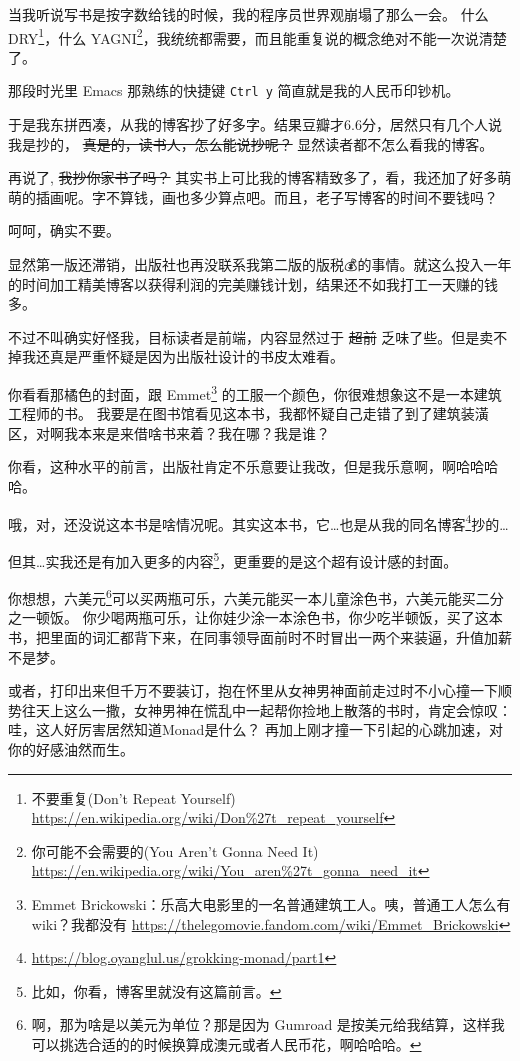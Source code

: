 \documentclass[letterspacing]{tufte-book}
\begin{document}
当我听说写书是按字数给钱的时候，我的程序员世界观崩塌了那么一会。
什么 DRY\footnote{不要重复(Don't Repeat Yourself) \url{https://en.wikipedia.org/wiki/Don\%27t\_repeat\_yourself}}，什么 YAGNI\footnote{你可能不会需要的(You Aren't Gonna Need It) \url{https://en.wikipedia.org/wiki/You\_aren\%27t\_gonna\_need\_it}}，我统统都需要，而且能重复说的概念绝对不能一次说清楚了。

那段时光里 Emacs 那熟练的快捷键 \texttt{Ctrl y} 简直就是我的人民币印钞机。

于是我东拼西凑，从我的博客抄了好多字。结果豆瓣才6.6分，居然只有几个人说我是抄的， \sout{真是的，读书人，怎么能说抄呢？} 显然读者都不怎么看我的博客。

再说了, \sout{我抄你家书了吗？} 其实书上可比我的博客精致多了，看，我还加了好多萌萌的插画呢。字不算钱，画也多少算点吧。而且，老子写博客的时间不要钱吗？

呵呵，确实不要。

显然第一版还滞销，出版社也再没联系我第二版的版税💰的事情。就这么投入一年的时间加工精美博客以获得利润的完美赚钱计划，结果还不如我打工一天赚的钱多。

不过不叫确实好怪我，目标读者是前端，内容显然过于 \sout{超前} 乏味了些。但是卖不掉我还真是严重怀疑是因为出版社设计的书皮太难看。

你看看那橘色的封面，跟 Emmet\footnote{Emmet Brickowski：乐高大电影里的一名普通建筑工人。咦，普通工人怎么有wiki？我都没有 \url{https://thelegomovie.fandom.com/wiki/Emmet\_Brickowski}} 的工服一个颜色，你很难想象这不是一本建筑工程师的书。
我要是在图书馆看见这本书，我都怀疑自己走错了到了建筑装潢区，对啊我本来是来借啥书来着？我在哪？我是谁？

你看，这种水平的前言，出版社肯定不乐意要让我改，但是我乐意啊，啊哈哈哈哈。

哦，对，还没说这本书是啥情况呢。其实这本书，它…也是从我的同名博客\footnote{\url{https://blog.oyanglul.us/grokking-monad/part1}}抄的…

但其\ldots{}实我还是有加入更多的内容\footnote{比如，你看，博客里就没有这篇前言。}，更重要的是这个超有设计感的封面。

你想想，六美元\footnote{啊，那为啥是以美元为单位？那是因为 Gumroad 是按美元给我结算，这样我可以挑选合适的的时候换算成澳元或者人民币花，啊哈哈哈。}可以买两瓶可乐，六美元能买一本儿童涂色书，六美元能买二分之一顿饭。
你少喝两瓶可乐，让你娃少涂一本涂色书，你少吃半顿饭，买了这本书，把里面的词汇都背下来，在同事领导面前时不时冒出一两个来装逼，升值加薪不是梦。

或者，打印出来但千万不要装订，抱在怀里从女神男神面前走过时不小心撞一下顺势往天上这么一撒，女神男神在慌乱中一起帮你捡地上散落的书时，肯定会惊叹：哇，这人好厉害居然知道Monad是什么？
再加上刚才撞一下引起的心跳加速，对你的好感油然而生。
\end{document}
